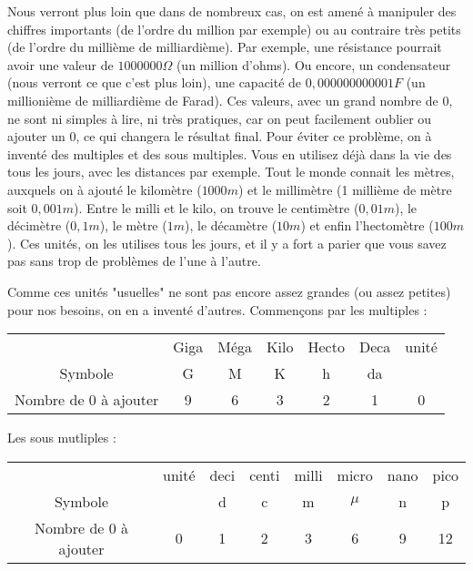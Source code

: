 Nous verront plus loin que dans de nombreux cas, on est amené à manipuler des chiffres importants (de l'ordre du million par exemple) ou au contraire très petits (de l'ordre du millième de milliardième). Par exemple, une résistance pourrait avoir une valeur de $1000000 \Omega$ (un million d'ohms). Ou encore, un condensateur (nous verront ce que c'est plus loin), une capacité de $0,000 000 000 001 F$ (un millionième de milliardième de Farad). Ces valeurs, avec un grand nombre de 0, ne sont ni simples à lire, ni très pratiques, car on peut facilement oublier ou ajouter un 0, ce qui changera le résultat final. Pour éviter ce problème, on à inventé des multiples et des sous multiples. Vous en utilisez déjà dans la vie des tous les jours, avec les distances par exemple. Tout le monde connait les mètres, auxquels on à ajouté le kilomètre ($1000 m$) et le millimètre (1 millième de mètre soit $0,001 m$). Entre le milli et le kilo, on trouve le centimètre ($0,01 m$), le décimètre ($0,1 m$), le mètre ($1 m$), le décamètre ($10 m$) et enfin l'hectomètre ($100 m$). Ces unités, on les utilises tous les jours, et il y a fort a parier que vous savez pas sans trop de problèmes de l'une à l'autre.
    
    Comme ces unités "usuelles" ne sont pas encore assez grandes (ou assez petites) pour nos besoins, on en a inventé d'autres. Commençons par les multiples :
    
    \begin{center}
        \begin{tabular}{|c|c|c|c|c|c|c|c|c|c|c|}
        \hline
            & \multicolumn{3}{c|}{Giga} & \multicolumn{3}{c|}{Méga} & Kilo & Hecto & Deca & unité \\
            Symbole & \multicolumn{3}{c|}{G} & \multicolumn{3}{c|}{M} & K & h & da & \\
        \hline
    	    Nombre de 0 à ajouter & \multicolumn{3}{c|}{9} & \multicolumn{3}{c|}{6} & 3 & 2 & 1 & 0 \\
            
        \hline
        \end{tabular}
    \end{center}
	Les sous mutliples : 
    \begin{center}
        \begin{tabular}{|c|c|c|c|c|c|c|c|c|c|c|c|c|c|}
            \hline
                & unité & deci & centi & milli & \multicolumn{3}{c|}{micro} & \multicolumn{3}{c|}{nano} & \multicolumn{3}{c|}{pico}\\
                Symbole & & d & c & m & \multicolumn{3}{c|}{$\mu$} & \multicolumn{3}{c|}{n} & \multicolumn{3}{c|}{p}  \\
        	\hline
        	    Nombre de 0 à ajouter & 0 & 1 & 2 & 3 & \multicolumn{3}{c|}{6} & \multicolumn{3}{c|}{9} & \multicolumn{3}{c|}{12} \\      
            \hline
        \end{tabular}
    \end{center}

